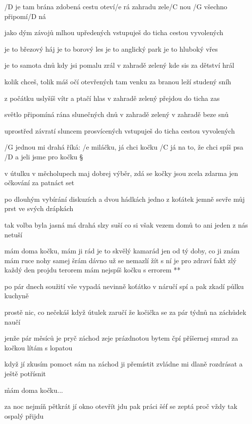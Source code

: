 /D je tam brána zdobená
cestu oteví/e rá
zahradu zele/C nou
/G všechno připomí/D ná \s

jako dým závojů
mlhou upředených
vstupuješ do ticha
cestou vyvolených \s

je to březový háj
je to borový les
je to anglický park
je to hluboký vřes \s

je to samota dnů
kdy jsi pomalu zrál
v zahradě zelený
kde sis za dětství hrál \s

kolik chceš, tolik máš
očí otevřených
tam venku za branou
leží studený sníh \s

z počátku uslyšíš
vítr a ptačí hlas
v zahradě zelený
přejdou do ticha zas \s

světlo připomíná
rána slunečných dnů
v zahradě zelený
v zahradě beze snů \s

uprostřed závratí
sluncem prosvícených
vstupuješ do ticha
cestou vyvolených




/G jednou mi drahá říká: /e miláčku, já chci kočku
/C já na to, že chci spíš psa /D a jeli jsme pro kočku \S

v útulku v měcholupech maj dobrej výběr, zdá se
kočky jsou zcela zdarma jen očkování za patnáct set \s

po dlouhým vybírání diskuzích a dvou hádkách
jedno z koťátek jemně sevře můj prst ve svých drápkách \s

tak volba byla jasná má drahá slzy suší
co si však vezem domů to ani jeden z nás netuší

\R mám doma kočku, mám ji rád je to skvělý kamarád
   jen od tý doby, co ji znám mám ruce nohy samej šrám
   dávno už se nemazlí žít s ní je pro zdraví fakt zlý
   každý den projdu terorem mám nejspíš kočku s errorem **

po pár dnech soužití vše vypadá nevinně
koťátko v náručí spí a pak zkadí půlku kuchyně \s

prostě nic, co nečekáš když útulek zaručí
že kočička se za pár týdnů na záchůdek naučí \s

jenže pár měsíců je pryč záchod zeje prázdnotou
bytem čpí příšernej smrad za kočkou lítám s lopatou \s

když jí zkusím pomoct sám na záchod ji přemístit
zvládne mi dlaně rozdrásat a ještě potřísnit

\r mám doma kočku...

za noc nejmíň pětkrát jí okno otevřít jdu
pak práci šéf se zeptá proč vždy tak ospalý přijdu \s

